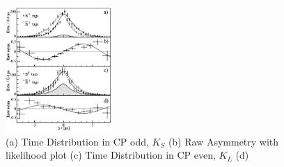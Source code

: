 \documentclass[floatfix,aps,prd,amsmath,amssymb]{revtex4}
\begin{document}
 \begin{figure}[h]
\centering
\includegraphics[width=0.36\textwidth]{figs/cpf.jpg}
\caption{(a) Time Distribution in CP odd, $K_{S}$ (b) Raw Asymmetry with likelihood plot (c) Time Distribution in CP even, $K_{L}$  (d)}
\label{BBD}
\end{figure}


\end{document}
